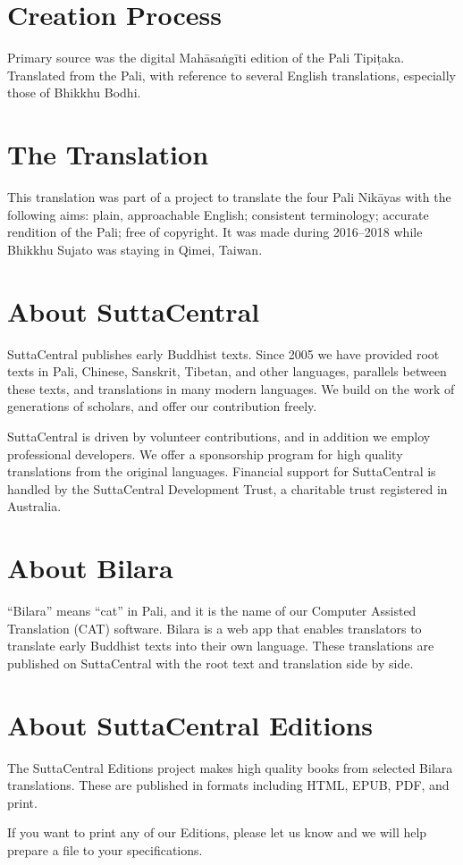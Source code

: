 \documentclass[12pt,openany]{book}%
\begin{document}
\section*{Creation Process}

Primary source was the digital \textsanskrit{Mahāsaṅgīti} edition of the Pali \textsanskrit{Tipiṭaka}. Translated from the Pali, with reference to several English translations, especially those of Bhikkhu Bodhi.

\section*{The Translation}

This translation was part of a project to translate the four Pali \textsanskrit{Nikāyas} with the following aims: plain, approachable English; consistent terminology; accurate rendition of the Pali; free of copyright. It was made during 2016–2018 while Bhikkhu Sujato was staying in Qimei, Taiwan.

\section*{About SuttaCentral}

SuttaCentral publishes early Buddhist texts. Since 2005 we have provided root texts in Pali, Chinese, Sanskrit, Tibetan, and other languages, parallels between these texts, and translations in many modern languages. We build on the work of generations of scholars, and offer our contribution freely.

SuttaCentral is driven by volunteer contributions, and in addition we employ professional developers. We offer a sponsorship program for high quality translations from the original languages. Financial support for SuttaCentral is handled by the SuttaCentral Development Trust, a charitable trust registered in Australia.

\section*{About Bilara}

“Bilara” means “cat” in Pali, and it is the name of our Computer Assisted Translation (CAT) software. Bilara is a web app that enables translators to translate early Buddhist texts into their own language. These translations are published on SuttaCentral with the root text and translation side by side.

\section*{About SuttaCentral Editions}

The SuttaCentral Editions project makes high quality books from selected Bilara translations. These are published in formats including HTML, EPUB, PDF, and print.

If you want to print any of our Editions, please let us know and we will help prepare a file to your specifications.

%
\end{document}
